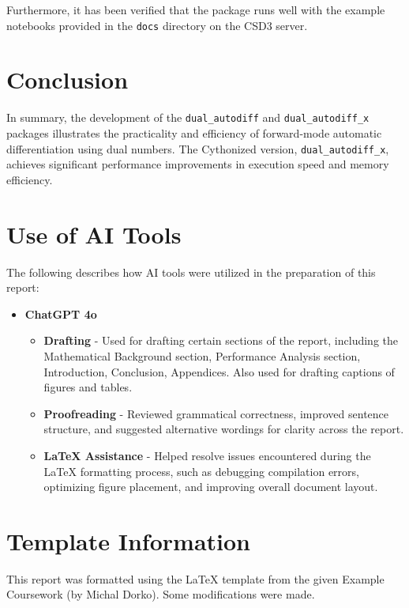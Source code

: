 \documentclass{article}
\begin{document}
Furthermore, it has been verified that the package runs well with the example notebooks provided in the \texttt{docs} directory on the CSD3 server.


\section{Conclusion}
In summary, the development of the \texttt{dual\_autodiff} and \texttt{dual\_autodiff\_x} packages illustrates the practicality and efficiency of forward-mode automatic differentiation using dual numbers. The Cythonized version, \texttt{dual\_autodiff\_x}, achieves significant performance improvements in execution speed and memory efficiency.


\clearpage
\newpage
\appendix
\section{Use of AI Tools}
The following describes how AI tools were utilized in the preparation of this report:
\begin{itemize}
    \item \textbf{ChatGPT 4o}
        \begin{itemize}
            \item \textbf{Drafting} - Used for drafting certain sections of the report, including the Mathematical Background section, Performance Analysis section, Introduction, Conclusion,  Appendices. Also used for drafting captions of figures and tables.
            \item \textbf{Proofreading} - Reviewed grammatical correctness, improved sentence structure, and suggested alternative wordings for clarity across the report.
            \item \textbf{LaTeX Assistance} - Helped resolve issues encountered during the LaTeX formatting process, such as debugging compilation errors, optimizing figure placement, and improving overall document layout.
        \end{itemize}
\end{itemize}


\section{Template Information}
This report was formatted using the LaTeX template from the given Example Coursework (by Michal Dorko). Some modifications were made.


\newpage
\printbibliography
\end{document}
